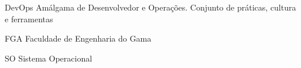 \begin{siglas}
  \item[DevOps] Amálgama de Desenvolvedor e Operações. Conjunto de práticas, 
cultura e ferramentas
  \item[FGA] Faculdade de Engenharia do Gama
  \item[SO] Sistema Operacional
\end{siglas}
